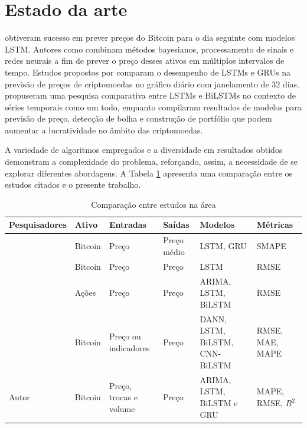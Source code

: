 
\section{Estado da arte} \label{sec:estado}

\textcite{Fer} obtiveram sucesso em prever preços do Bitcoin para o dia seguinte com modelos LSTM. Autores como \textcite{Tri} combinam métodos bayesianos, processamento de sinais e redes neurais a fim de prever o preço desses ativos em múltiplos intervalos de tempo.
Estudos propostos por \textcite{lstmvsgru} comparam o desempenho de LSTMs e GRUs na previsão de preços de criptomoedas no gráfico diário com janelamento de 32 dias.
\textcite{Siami} propuseram uma pesquisa comparativa entre LSTMs e BiLSTMs no contexto de séries temporais como um todo, enquanto
\textcite{Zhang} compilaram resultados de modelos para previsão de preço, detecção de bolha e construção de portfólio que podem aumentar a lucratividade no âmbito das criptomoedas.

A variedade de algoritmos empregados e a diversidade em resultados obtidos demonstram a complexidade do problema, reforçando, assim, a necessidade de se explorar diferentes abordagens. A Tabela \ref{tabela:lista_estudos} apresenta uma comparação entre os estudos citados e o presente trabalho.

\begin{table}[!htb]
  \scriptsize
  \caption{Comparação entre estudos na área} \label{tabela:lista_estudos}
  \begin{tabularx}{\textwidth}{l|X|X|X|X|X} \hline
    Pesquisadores & Ativo & Entradas & Saídas & Modelos & Métricas \\ \hline
    \cite{lstmvsgru} & Bitcoin & Preço & Preço médio & LSTM, GRU & SMAPE \\ \hline
    \cite{Fer} & Bitcoin & Preço & Preço & LSTM & RMSE \\ \hline
    \cite{Siami} & Ações & Preço & Preço& ARIMA, LSTM, BiLSTM & RMSE \\ \hline
    \cite{Tri} & Bitcoin & Preço ou indicadores& Preço & DANN, LSTM, BiLSTM, CNN-BiLSTM & RMSE, MAE, MAPE \\ \hline
    Autor & Bitcoin & Preço, trocas e volume & Preço & ARIMA, LSTM, BiLSTM e GRU & MAPE, RMSE, $R^2$ \\ \hline
  \end{tabularx}
\end{table}
